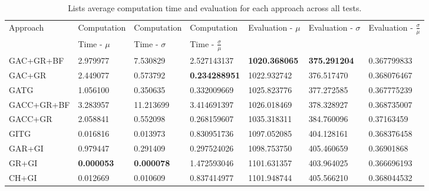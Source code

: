 \begin{table}[H]
    \centering
    \caption{Lists average computation time and evaluation for each approach across all tests.}
    \label{tab:averages-all-tests}
    \scriptsize
    \begin{tabular}{lllllll}
        Approach   & Computation  & Computation & Computation & Evaluation - $\mu$ & Evaluation - $\sigma$ & Evaluation - $\frac{\sigma}{\mu}$ \\
                   & Time - $\mu$ & Time - $\sigma$ & Time - $\frac{\sigma}{\mu}$ & & & \\
        GAC+GR+BF  & 2.979977                 & 7.530829                    & 2.527143137                             & \textbf{1020.368065} & \textbf{375.291204} & 0.367799833                       \\
        GAC+GR     & 2.449077                 & 0.573792                    & \textbf{0.234288951}                    & 1022.932742        & 376.517470            & 0.368076467                       \\
        GATG       & 1.056100                 & 0.350635                    & 0.332009669                             & 1025.823776        & 377.272585            & 0.367775239                       \\
        GACC+GR+BF & 3.283957                 & 11.213699                   & 3.414691397                             & 1026.018469        & 378.328927            & 0.368735007                       \\
        GACC+GR    & 2.058841                 & 0.552098                    & 0.268159607                             & 1035.318311        & 384.760096            & 0.37163459                        \\
        GITG       & 0.016816                 & 0.013973                    & 0.830951736                             & 1097.052085        & 404.128161            & 0.368376458                       \\
        GAR+GI     & 0.979447                 & 0.291409                    & 0.297524026                             & 1098.753750        & 405.460659            & 0.36901868                        \\
        GR+GI      & \textbf{0.000053}        & \textbf{0.000078}           & 1.472593046                             & 1101.631357        & 403.964025            & 0.366696193                       \\
        CH+GI      & 0.012669                 & 0.010609                    & 0.837414977                             & 1101.948744        & 405.566210            & 0.368044532                       \\

\end{tabular}
\end{table}
